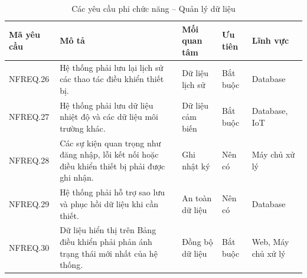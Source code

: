 \documentclass[a4paper,12pt]{article}
\begin{document}

\begin{table}[H]
\centering
\caption{Các yêu cầu phi chức năng -- Quản lý dữ liệu}
\small
\begin{tabularx}{\linewidth}{|p{1.8cm}|X|p{2.5cm}|p{1.7cm}|p{2.1cm}|}
\hline
\textbf{Mã yêu cầu} & \textbf{Mô tả} & \textbf{Mối quan tâm} & \textbf{Ưu tiên} & \textbf{Lĩnh vực}\\
\hline
NFREQ.26 & Hệ thống phải lưu lại lịch sử các thao tác điều khiển thiết bị. & Dữ liệu lịch sử & Bắt buộc & Database\\
\hline
NFREQ.27 & Hệ thống phải lưu dữ liệu nhiệt độ và các dữ liệu môi trường khác. & Dữ liệu cảm biến & Bắt buộc & Database, IoT\\
\hline
NFREQ.28 & Các sự kiện quan trọng như đăng nhập, lỗi kết nối hoặc điều khiển thiết bị phải được ghi nhận. & Ghi nhật ký & Nên có & Máy chủ xử lý\\
\hline
NFREQ.29 & Hệ thống phải hỗ trợ sao lưu và phục hồi dữ liệu khi cần thiết. & An toàn dữ liệu & Nên có & Database\\
\hline
NFREQ.30 & Dữ liệu hiển thị trên Bảng điều khiển phải phản ánh trạng thái mới nhất của hệ thống. & Đồng bộ dữ liệu & Bắt buộc & Web, Máy chủ xử lý\\
\hline
\end{tabularx}
\end{table}

\end{document}
